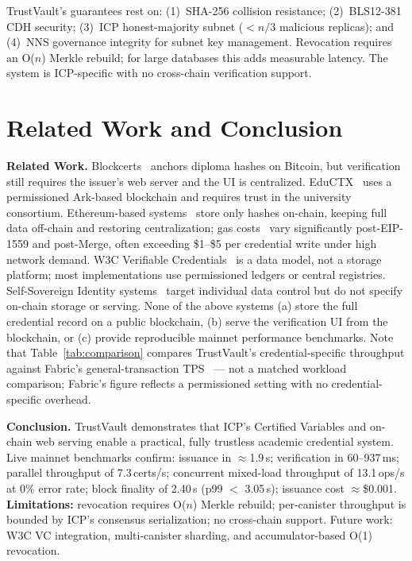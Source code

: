 \documentclass[conference]{IEEEtran}
\begin{document}
TrustVault's guarantees rest on: (1)~SHA-256 collision resistance; (2)~BLS12-381 CDH security; (3)~ICP honest-majority subnet ($< n/3$ malicious replicas); and (4)~NNS governance integrity for subnet key management. Revocation requires an O($n$) Merkle rebuild; for large databases this adds measurable latency. The system is ICP-specific with no cross-chain verification support.

\section{Related Work and Conclusion}
\label{sec:relconc}

\textbf{Related Work.} Blockcerts~\cite{grech2017blockchain} anchors diploma hashes on Bitcoin, but verification still requires the issuer's web server and the UI is centralized. EduCTX~\cite{turk2018eductx} uses a permissioned Ark-based blockchain and requires trust in the university consortium. Ethereum-based systems~\cite{lizcano2020blockchain} store only hashes on-chain, keeping full data off-chain and restoring centralization; gas costs~\cite{wood2014ethereum} vary significantly post-EIP-1559 and post-Merge, often exceeding \$1--\$5 per credential write under high network demand. W3C Verifiable Credentials~\cite{w3c2022vc} is a data model, not a storage platform; most implementations use permissioned ledgers or central registries. Self-Sovereign Identity systems~\cite{allen2016decentralized} target individual data control but do not specify on-chain storage or serving. None of the above systems (a) store the full credential record on a public blockchain, (b) serve the verification UI from the blockchain, or (c) provide reproducible mainnet performance benchmarks. Note that Table~\ref{tab:comparison} compares TrustVault's credential-specific throughput against Fabric's general-transaction TPS~\cite{androulaki2018fabric} — not a matched workload comparison; Fabric's figure reflects a permissioned setting with no credential-specific overhead.

\textbf{Conclusion.} TrustVault demonstrates that ICP's Certified Variables and on-chain web serving enable a practical, fully trustless academic credential system. Live mainnet benchmarks confirm: issuance in $\approx$1.9\,s; verification in 60--937\,ms; parallel throughput of 7.3\,certs/s; concurrent mixed-load throughput of 13.1\,ops/s at 0\% error rate; block finality of 2.40\,s (p99 $<$ 3.05\,s); issuance cost $\approx$\$0.001. \textbf{Limitations:} revocation requires O($n$) Merkle rebuild; per-canister throughput is bounded by ICP's consensus serialization; no cross-chain support. Future work: W3C VC integration, multi-canister sharding, and accumulator-based O(1) revocation.
\end{document}
